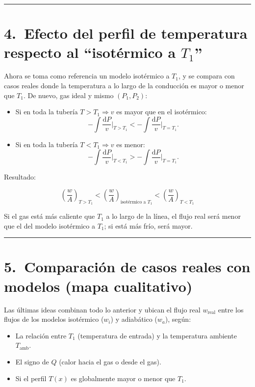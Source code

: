 \documentclass[11pt,a4paper]{article}
\begin{document}
\bigskip
\hrule
\bigskip

\section*{4.\ Efecto del perfil de temperatura respecto al ``isotérmico a \(T_1\)''}

Ahora se toma como referencia un modelo isotérmico a \(T_1\), y se compara con
casos reales donde la temperatura a lo largo de la conducción es mayor o menor
que \(T_1\). De nuevo, gas ideal y mismo \((P_1,P_2)\):

\begin{itemize}
  \item Si en toda la tubería \(T > T_1 \Rightarrow v\) es mayor que en el isotérmico:
  \[
    -\int \frac{\mathrm dP}{v}\bigg|_{T>T_1}
    <
    -\int \frac{\mathrm dP}{v}\bigg|_{T=T_1}.
  \]
  \item Si en toda la tubería \(T < T_1 \Rightarrow v\) es menor:
  \[
    -\int \frac{\mathrm dP}{v}\bigg|_{T<T_1}
    >
    -\int \frac{\mathrm dP}{v}\bigg|_{T=T_1}.
  \]
\end{itemize}

Resultado:

\begin{equation}
\boxed{
\left(\frac{w}{A}\right)_{T>T_1}
<
\left(\frac{w}{A}\right)_{\text{isotérmico a }T_1}
<
\left(\frac{w}{A}\right)_{T<T_1}
}
\end{equation}

Si el gas está más caliente que \(T_1\) a lo largo de la línea, el flujo real
será menor que el del modelo isotérmico a \(T_1\); si está más frío, será mayor.

\bigskip
\hrule
\bigskip

\section*{5.\ Comparación de casos reales con modelos (mapa cualitativo)}

Las últimas ideas combinan todo lo anterior y ubican el flujo real
\(w_\text{real}\) entre los flujos de los modelos isotérmico (\(w_i\)) y
adiabático (\(w_a\)), según:

\begin{itemize}
  \item La relación entre \(T_1\) (temperatura de entrada) y la temperatura ambiente \(T_\text{amb}\).
  \item El signo de \(Q\) (calor hacia el gas o desde el gas).
  \item Si el perfil \(T(x)\) es globalmente mayor o menor que \(T_1\).
\end{itemize}
\end{document}
